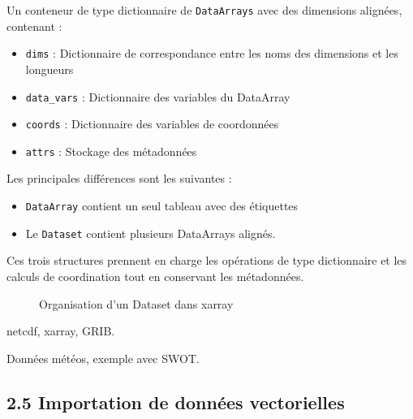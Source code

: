 Un conteneur de type dictionnaire de \texttt{DataArrays} avec des
dimensions alignées, contenant :

\begin{itemize}
\item
  \texttt{dims} : Dictionnaire de correspondance entre les noms des
  dimensions et les longueurs
\item
  \texttt{data\_vars} : Dictionnaire des variables du DataArray
\item
  \texttt{coords} : Dictionnaire des variables de coordonnées
\item
  \texttt{attrs} : Stockage des métadonnées
\end{itemize}

Les principales différences sont les suivantes :

\begin{itemize}
\item
  \texttt{DataArray} contient un seul tableau avec des étiquettes
\item
  Le \texttt{Dataset} contient plusieurs DataArrays alignés.
\end{itemize}

Ces trois structures prennent en charge les opérations de type
dictionnaire et les calculs de coordination tout en conservant les
métadonnées.

\begin{figure}
\centering
{}
\caption{Organisation d'un Dataset dans xarray}
\end{figure}

netcdf, xarray, GRIB.

Données météos, exemple avec SWOT.

\subsection{\texorpdfstring{{2.5} Importation de données
vectorielles}{2.5 Importation de données vectorielles}}\label{importation-de-donnuxe9es-vectorielles}

